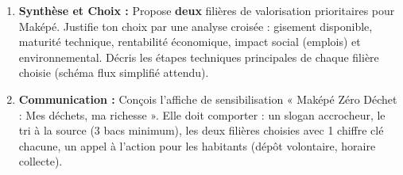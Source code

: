 \documentclass[11pt]{article}
\newcommand{\cle}[1]{{\popxbold\color{popdark}#1}}
\begin{document}
\begin{enumerate}
\begin{enumerate}
        \item Calcule la masse de déchets plastiques nécessaire pour produire \num{10 000} pavés EcoPave.
        \item Compare le coût total d'un trottoir de \SI{100}{m^2} (pose comprise estimée à \SI{1500}{FCFA/m^2} pour les deux types) entre pavés ciment et pavés plastique-sable.
        \item Liste trois avantages techniques et deux avantages environnementaux majeurs du pavé plastique-sable.
    \end{enumerate}
    \item \textbf{Synthèse et Choix :} Propose \textbf{deux} filières de valorisation prioritaires pour Maképé. Justifie ton choix par une analyse croisée : gisement disponible, maturité technique, rentabilité économique, impact social (emplois) et environnemental. Décris les \cle{étapes techniques} principales de chaque filière choisie (schéma flux simplifié attendu).
    \item \textbf{Communication :} Conçois l'affiche de sensibilisation « Maképé Zéro Déchet : Mes déchets, ma richesse ». Elle doit comporter : un slogan accrocheur, le tri à la source (3 bacs minimum), les deux filières choisies avec 1 chiffre clé chacune, un appel à l'action pour les habitants (dépôt volontaire, horaire collecte).
\end{enumerate}
\end{document}

